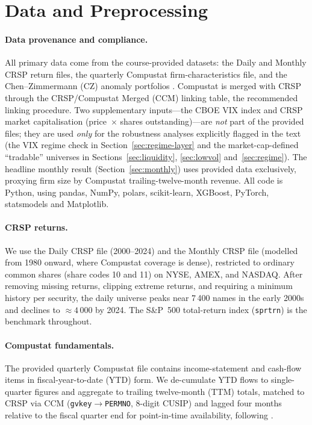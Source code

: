 \documentclass[11pt,a4paper]{article}
\begin{document}
\section{Data and Preprocessing}
\label{sec:data}

\paragraph{Data provenance and compliance.}
All primary data come from the course-provided datasets: the Daily and Monthly
CRSP return files, the quarterly Compustat firm-characteristics file, and the
Chen--Zimmermann (CZ) anomaly portfolios \citep{chen2022}. Compustat is merged
with CRSP through the CRSP/Compustat Merged (CCM) linking table, the recommended
linking procedure. Two supplementary inputs---the CBOE VIX index and CRSP market
capitalisation (price~$\times$ shares outstanding)---are \emph{not} part of the
provided files; they are used \emph{only} for the robustness analyses explicitly
flagged in the text (the VIX regime check in Section~\ref{sec:regime-layer} and
the market-cap-defined ``tradable'' universes in Sections~\ref{sec:liquidity},
\ref{sec:lowvol} and~\ref{sec:regime}). The headline monthly result
(Section~\ref{sec:monthly}) uses provided data exclusively, proxying firm size
by Compustat trailing-twelve-month revenue. All code is Python, using pandas,
NumPy, polars, scikit-learn, XGBoost, PyTorch, statsmodels and Matplotlib.

\paragraph{CRSP returns.}
We use the Daily CRSP file (2000--2024) and the Monthly CRSP file (modelled from
1980 onward, where Compustat coverage is dense), restricted to ordinary common
shares (share codes 10 and 11) on NYSE, AMEX, and NASDAQ. After removing missing
returns, clipping extreme returns, and requiring a minimum history per security,
the daily universe peaks near 7\,400 names in the early 2000s and declines to
$\approx 4\,000$ by 2024. The S\&P~500 total-return index (\texttt{sprtrn}) is
the benchmark throughout.

\paragraph{Compustat fundamentals.}
The provided quarterly Compustat file contains income-statement and cash-flow
items in fiscal-year-to-date (YTD) form. We de-cumulate YTD flows to
single-quarter figures and aggregate to trailing twelve-month (TTM) totals,
matched to CRSP via CCM (\texttt{gvkey}$\to$\texttt{PERMNO}, 8-digit CUSIP) and
lagged four months relative to the fiscal quarter end for point-in-time
availability, following \citet{famafrench2015}.
\end{document}
